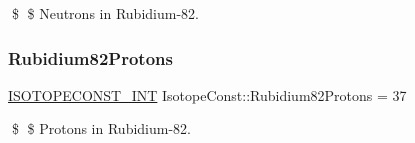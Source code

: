 \$ \$ Neutrons in Rubidium-\/82. \mbox{\label{group___isotope_const-_rubidium-_rb82_ga77658f665ecca9ffcc203c5df5153115}} 
\subsubsection{\texorpdfstring{Rubidium82\+Protons}{Rubidium82Protons}}
{\footnotesize\ttfamily \mbox{\hyperlink{group___isotope_const-_macros_ga5f18360b3e99483a35c32d789e62621c}{I\+S\+O\+T\+O\+P\+E\+C\+O\+N\+S\+T\+\_\+\+I\+NT}} Isotope\+Const\+::\+Rubidium82\+Protons = 37}

\$ \$ Protons in Rubidium-\/82. 